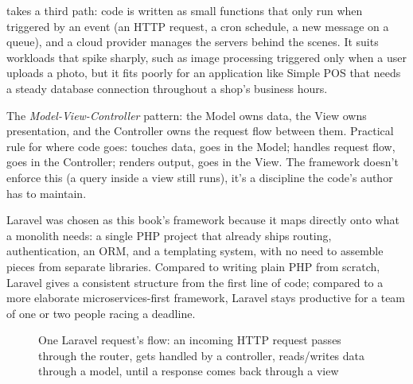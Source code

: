  takes a third path: code is written as small functions
that only run when triggered by an event (an HTTP request, a cron
schedule, a new message on a queue), and a cloud provider manages the
servers behind the scenes. It suits workloads that spike sharply, such as
image processing triggered only when a user uploads a photo, but it fits
poorly for an application like Simple POS that needs a steady database
connection throughout a shop's business hours.

\begin{istilahpenting}
\begin{description}[leftmargin=0pt,style=nextline]
  \item[MVC] The \textit{Model-View-Controller} pattern: the Model owns data, the View owns presentation, and the Controller owns the request flow between them. Practical rule for where code goes: touches data, goes in the Model; handles request flow, goes in the Controller; renders output, goes in the View. The framework doesn't enforce this (a query inside a view still runs), it's a discipline the code's author has to maintain.
\end{description}
\end{istilahpenting}

Laravel was chosen as this book's framework because it maps directly onto
what a monolith needs: a single PHP project that already ships routing,
authentication, an ORM, and a templating system, with no need to assemble
pieces from separate libraries. Compared to writing plain PHP from scratch,
Laravel gives a consistent  structure from the first line of code;
compared to a more elaborate microservices-first framework, Laravel stays
productive for a team of one or two people racing a deadline.

\begin{figure}[htbp]
\centering
{}
\caption{One Laravel request's flow: an incoming HTTP request passes
through the router, gets handled by a controller, reads/writes data
through a model, until a response comes back through a view}
\label{fig:laravel-lifecycle}
\end{figure}

